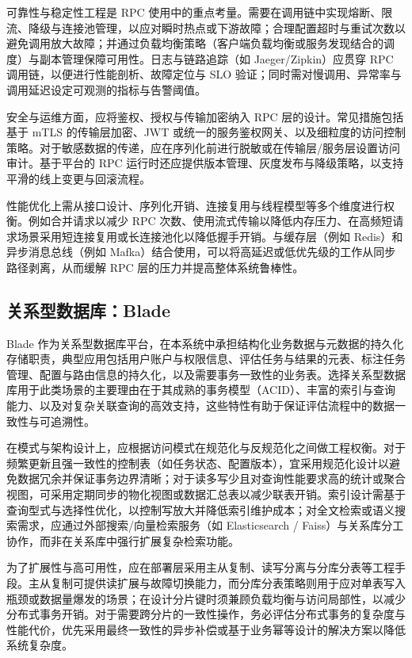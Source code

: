可靠性与稳定性工程是 RPC 使用中的重点考量。需要在调用链中实现熔断、限流、降级与连接池管理，以应对瞬时热点或下游故障；合理配置超时与重试次数以避免调用放大故障；并通过负载均衡策略（客户端负载均衡或服务发现结合的调度）与副本管理保障可用性。日志与链路追踪（如 Jaeger/Zipkin）应贯穿 RPC 调用链，以便进行性能剖析、故障定位与 SLO 验证；同时需对慢调用、异常率与调用延迟设定可观测的指标与告警阈值。

安全与运维方面，应将鉴权、授权与传输加密纳入 RPC 层的设计。常见措施包括基于 mTLS 的传输层加密、JWT 或统一的服务鉴权网关、以及细粒度的访问控制策略。对于敏感数据的传递，应在序列化前进行脱敏或在传输层/服务层设置访问审计。基于平台的 RPC 运行时还应提供版本管理、灰度发布与降级策略，以支持平滑的线上变更与回滚流程。

性能优化上需从接口设计、序列化开销、连接复用与线程模型等多个维度进行权衡。例如合并请求以减少 RPC 次数、使用流式传输以降低内存压力、在高频短请求场景采用短连接复用或长连接池化以降低握手开销。与缓存层（例如 Redis）和异步消息总线（例如 Mafka）结合使用，可以将高延迟或低优先级的工作从同步路径剥离，从而缓解 RPC 层的压力并提高整体系统鲁棒性。
\subsection{关系型数据库：Blade}
Blade 作为关系型数据库平台，在本系统中承担结构化业务数据与元数据的持久化存储职责，典型应用包括用户账户与权限信息、评估任务与结果的元表、标注任务管理、配置与路由信息的持久化，以及需要事务一致性的业务表。选择关系型数据库用于此类场景的主要理由在于其成熟的事务模型（ACID）、丰富的索引与查询能力、以及对复杂关联查询的高效支持，这些特性有助于保证评估流程中的数据一致性与可追溯性。

在模式与架构设计上，应根据访问模式在规范化与反规范化之间做工程权衡\cite{10.1007/978-3-030-39951-1_18}。对于频繁更新且强一致性的控制表（如任务状态、配置版本），宜采用规范化设计以避免数据冗余并保证事务边界清晰；对于读多写少且对查询性能要求高的统计或聚合视图，可采用定期同步的物化视图或数据汇总表以减少联表开销。索引设计需基于查询型式与选择性优化，以控制写放大并降低索引维护成本；对全文检索或语义搜索需求，应通过外部搜索/向量检索服务（如 Elasticsearch / Faiss）与关系库分工协作，而非在关系库中强行扩展复杂检索功能。

为了扩展性与高可用性，应在部署层采用主从复制、读写分离与分库分表等工程手段。主从复制可提供读扩展与故障切换能力，而分库分表策略则用于应对单表写入瓶颈或数据量爆发的场景；在设计分片键时须兼顾负载均衡与访问局部性，以减少分布式事务开销。对于需要跨分片的一致性操作，务必评估分布式事务的复杂度与性能代价，优先采用最终一致性的异步补偿或基于业务幂等设计的解决方案以降低系统复杂度。

